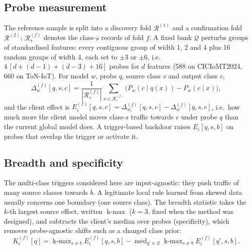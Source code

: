 \documentclass[conference]{IEEEtran}
\DeclareMathOperator*{\kmax}{k\text{-}max}
\DeclareMathOperator*{\med}{med}
\begin{document}
\subsection{Probe measurement}
The reference sample is split into a discovery fold $\mathcal{R}^{(1)}$ and a confirmation fold $\mathcal{R}^{(2)}$; $\mathcal{R}^{(f)}_s$ denotes the class-$s$ records of fold $f$. A fixed bank $\mathcal{Q}$ perturbs groups of standardised features: every contiguous group of width 1, 2 and 4 plus 16 random groups of width 4, each set to $\pm3$ or $\pm6$, i.e.\ $4\,[d+(d-1)+(d-3)+16]$ probes for $d$ features (588 on CICIoMT2024, 660 on ToN-IoT). For model $w$, probe $q$, source class $s$ and output class $c$,
\begin{equation}
\Delta_w^{(f)}[q,s,c] = \frac{1}{|\mathcal{R}^{(f)}_s|}\sum_{x \in \mathcal{R}^{(f)}_s} \big(P_w(c \mid q(x)) - P_w(c \mid x)\big),
\end{equation}
and the client effect is $E_i^{(f)}[q,s,c] = \Delta_{w_i}^{(f)}[q,s,c] - \Delta_{w}^{(f)}[q,s,c]$, i.e.\ how much more the client model moves class-$s$ traffic towards $c$ under probe $q$ than the current global model does. A trigger-based backdoor raises $E_i[q,s,b]$ on probes that overlap the trigger or activate it.

\subsection{Breadth and specificity}
The multi-class triggers considered here are input-agnostic: they push traffic of many source classes towards $b$. A legitimate local rule learned from skewed data usually concerns one boundary (one source class). The breadth statistic takes the $k$-th largest source effect, written $\kmax$ ($k=3$, fixed when the method was designed), and subtracts the client's median over probes (specificity), which removes probe-agnostic shifts such as a changed class prior:
\begin{equation}
K_i^{(f)}[q] = \kmax_{s \neq b} E_i^{(f)}[q,s,b] - \med_{q' \in \mathcal{Q}} \kmax_{s \neq b} E_i^{(f)}[q',s,b].
\end{equation}
\end{document}
